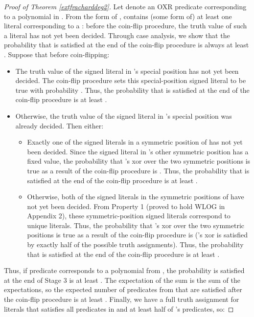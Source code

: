 \documentclass{article}
\begin{document}
\begin{proof}[Proof of Theorem \ref{extfracharddeg2}]
Let  denote an OXR predicate corresponding to a polynomial in . From the form of ,   contains (some form of) at least one literal corresponding to a : before the coin-flip procedure, the truth value of such a literal has not yet been decided. Through case analysis, we show that the probability that  is satisfied at the end of the coin-flip procedure is always at least .
Suppose that before coin-flipping:
\begin{itemize}
\item The truth value of the signed literal in 's special position has not yet been decided. The coin-flip procedure sets this special-position signed literal to be true with probability . Thus, the probability that  is satisfied at the end of the coin-flip procedure is at least . 
\item Otherwise, the truth value of the signed literal in 's special position was already decided. Then either:

\vspace{-3mm}

\begin{itemize}
\item Exactly one of the signed literals in a symmetric position of  has not yet been decided. Since the signed literal in 's other symmetric position has a fixed value, the probability that 's xor over the two symmetric positions is true as a result of the coin-flip procedure is . Thus, the probability that  is satisfied at the end of the coin-flip procedure is at least . 
\item Otherwise, both of the signed literals in the symmetric positions of  have not yet been decided. From Property 1 (proved to hold WLOG in Appendix 2), these symmetric-position signed literals correspond to unique literals. Thus, the probability that 's xor over the two symmetric positions is true as a result of the coin-flip procedure is  ('s xor is satisfied by exactly half of the possible truth assignments). Thus, the probability that  is satisfied at the end of the coin-flip procedure is at least . 
\end{itemize}
\end{itemize}

\vspace{-3mm}

\noindent Thus, if predicate  corresponds to a polynomial from , the probability  is satisfied at the end of Stage 3 is at least . The expectation of the sum is the sum of the expectations, so  the expected number of predicates from   that are satisfied after the coin-flip procedure is at least . Finally, we have a full truth assignment for literals  that satisfies all predicates in  and at least half of 's predicates, so:





\end{proof}
\end{document}
